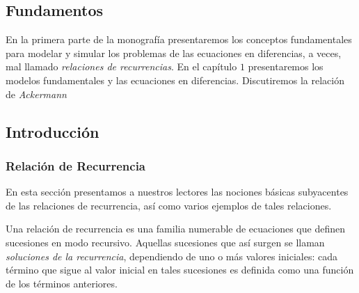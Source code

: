 \begin{partbacktext}
\part{Fundamentos}
En la primera parte de la monografía presentaremos los conceptos fundamentales para modelar y simular los problemas de las ecuaciones en diferencias, a veces, mal llamado \emph{relaciones de recurrencias}. En el capítulo $1$ presentaremos los modelos fundamentales y las ecuaciones en diferencias. Discutiremos la relación de \emph{Ackermann}
\end{partbacktext}
\chapter{Introducción}
\section{Relación de Recurrencia}
En esta sección presentamos a nuestros lectores las nociones básicas subyacentes de las relaciones de recurrencia, así como varios ejemplos de tales relaciones.

Una relación de recurrencia es una familia numerable de ecuaciones que definen sucesiones en modo recursivo. Aquellas sucesiones que así surgen se llaman \emph{soluciones de la recurrencia}, dependiendo de uno o más valores iniciales: cada término que sigue al valor inicial en tales sucesiones es definida como una función de los términos anteriores.

